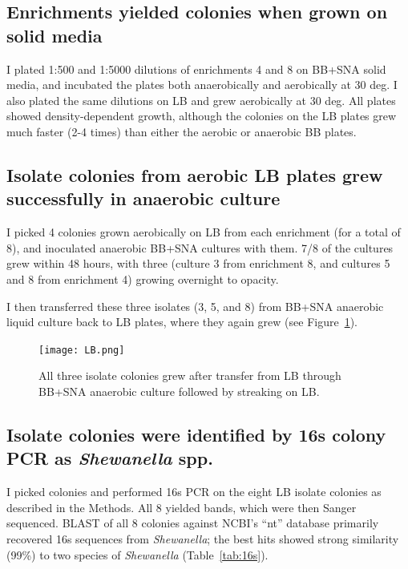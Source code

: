 \documentclass{article}
\begin{document}
\subsection*{Enrichments yielded colonies when grown on solid media}

I plated 1:500 and 1:5000 dilutions of enrichments 4 and 8 on BB+SNA
solid media, and incubated the plates both anaerobically and
aerobically at 30 deg.  I also plated the same dilutions on LB and
grew aerobically at 30 deg.  All plates showed density-dependent growth,
although the colonies on the LB plates grew much faster (2-4 times)
than either the aerobic or anaerobic BB plates.

\subsection*{Isolate colonies from aerobic LB plates grew successfully
  in anaerobic culture}

I picked 4 colonies grown aerobically on LB from each enrichment (for
a total of 8), and inoculated anaerobic BB+SNA cultures with them.
7/8 of the cultures grew within 48 hours, with three (culture 3 from
enrichment 8, and cultures 5 and 8 from enrichment 4) growing
overnight to opacity.

I then transferred these three isolates (3, 5, and 8) from BB+SNA
anaerobic liquid culture back to LB plates, where they again grew
(see Figure~\ref{fig:LB}).

\begin{figure}[!ht]
  \centerline{\texttt{[image: LB.png]}}
  \caption{All three isolate colonies grew after transfer from LB
    through BB+SNA anaerobic culture followed by streaking on LB.}
  \label{fig:LB}
\end{figure}

\subsection*{Isolate colonies were identified by 16s colony PCR as {\em Shewanella} spp.}

I picked colonies and performed 16s PCR on the eight LB isolate
colonies as described in the Methods.  All 8 yielded bands, which were
then Sanger sequenced.  BLAST of all 8 colonies against NCBI's ``nt''
database primarily recovered 16s sequences from {\em Shewanella}; the
best hits showed strong similarity (99\%) to two species of
{\em Shewanella} (Table~\ref{tab:16s}).
\end{document}

